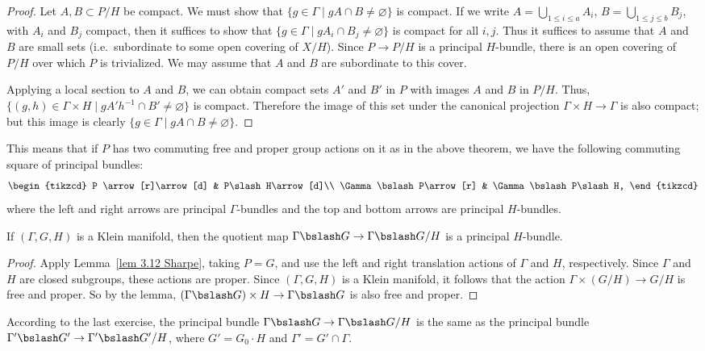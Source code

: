 \begin{proof}
    Let $A,B\subset P\slash H$ be compact. We must show that $\{g\in\Gamma\mid gA\cap B\neq \varnothing\}$ is compact. If we write $A=\bigcup_{1\leq i\leq a}A_i$, $B=\bigcup_{1\leq j\leq b}B_j$, with $A_i$ and $B_j$ compact, then it suffices to show that $\{g\in\Gamma\mid gA_i\cap B_j\neq\varnothing\}$ is compact for all $i,j$. Thus it suffices to assume that $A$ and $B$ are small sets (i.e.\ subordinate to some open covering of $X\slash H$). Since $P\to P\slash H$ is a principal $H$-bundle, there is an open covering of $P\slash H$ over which $P$ is trivialized. We may assume that $A$ and $B$ are subordinate to this cover.

    Applying a local section to $A$ and $B$, we can obtain compact sets $A'$ and $B'$ in $P$ with images $A$ and $B$ in $P\slash H$. Thus, $\{(g,h)\in\Gamma\times H\mid gA' h^{-1}\cap B'\neq \varnothing\}$ is compact. Therefore the image of this set under the canonical projection $\Gamma\times H\to \Gamma$ is also compact; but this image is clearly $\{g\in\Gamma\mid gA\cap B\neq \varnothing\}$.
\end{proof}


This means that if $P$ has two commuting free and proper group actions on it as in the above theorem, we have the following commuting square of principal bundles:
\[\begin{tikzcd}
    P \arrow[r]\arrow[d] & P\slash H\arrow[d]\\
    \Gamma\bslash P\arrow[r] & \Gamma\bslash P\slash H,
\end{tikzcd}\]
where the left and right arrows are principal $\Gamma$-bundles and the top and bottom arrows are principal $H$-bundles.


\begin{cor}
    If $(\Gamma,G,H)$ is a Klein manifold, then the quotient map $\Gamma\bslash G\to \Gamma\bslash G\slash H$ is a principal $H$-bundle.
\end{cor}
\begin{proof}
    Apply Lemma~\ref{lem 3.12 Sharpe}, taking $P=G$, and use the left and right translation actions of $\Gamma$ and $H$, respectively. Since $\Gamma$ and $H$ are closed subgroups, these actions are proper. Since $(\Gamma,G,H)$ is a Klein manifold, it follows that the action $\Gamma\times(G\slash H)\to G\slash H$ is free and proper. So by the lemma, $(\Gamma\bslash G)\times H\to \Gamma\bslash G$ is also free and proper.
\end{proof}

According to the last exercise, the principal bundle $\Gamma\bslash G\to \Gamma\bslash G\slash H$ is the same as the principal bundle $\Gamma'\bslash G'\to \Gamma'\bslash G'\slash H$, where $G'=G_0\cdot H$ and $\Gamma'=G'\cap\Gamma$.

